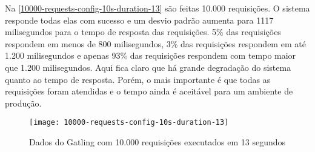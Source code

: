 Na \autoref{10000-requests-config-10s-duration-13} são feitas 10.000 requisições.
O sistema responde todas elas com sucesso e um desvio padrão aumenta para 1117 milisegundos
para o tempo de resposta das requisições.
5\% das requisições respondem em menos de 800 milisegundos, 3\% das requisições
respondem em até 1.200 milisegundos e apenas 93\% das requisições
respondem com tempo maior que 1.200 milisegundos. Aqui fica claro que há grande
degradação do sistema quanto ao tempo de resposta. Porém, o mais importante
é que todas as requisições foram atendidas e o tempo ainda é aceitável para
um ambiente de produção.

\begin{figure}[h]
  \texttt{[image: 10000-requests-config-10s-duration-13]}
  \caption{Dados do Gatling com 10.000 requisições executados em 13 segundos}
  \label{10000-requests-config-10s-duration-13}
\end{figure}

